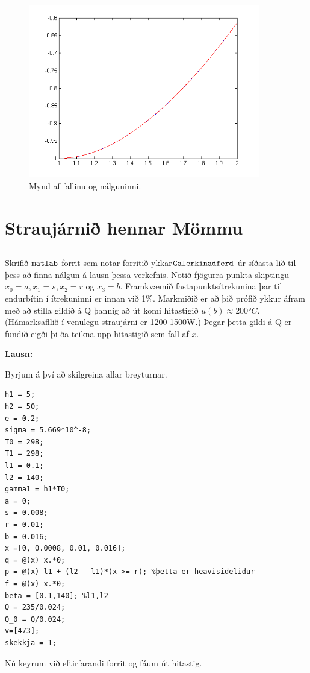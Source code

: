 \documentclass[11pt,a4paper,titlepage]{article}
\begin{document}
   \begin{figure}[h!]
        \centering
        \includegraphics[width=0.9\textwidth]{nalgun2_4.png}
        \caption{Mynd af fallinu og nálguninni.}
        \label{fig:awesome_image2}
    \end{figure}
\section{Straujárnið hennar Mömmu}



\subsection{}

Skrifið $\verb|matlab|$-forrit sem notar forritið ykkar$ \verb|Galerkinadferd| $ úr síðasta lið til þess að finna nálgun á lausn þessa verkefnis. Notið fjögurra punkta skiptingu  $x_{0}=a, x_{1}=s, x_{2}=r$ og $x_{3}=b$.  Framkvæmið fastapunktsítrekunina þar til endurbítin í ítrekuninni er innan við 1\%.  Markmiðið er að þið prófið ykkur áfram með að stilla gildið á Q þannig að út komi hitastigið $u(b)\approx 200°C$. (Hámarksafllið í venulegu straujárni er 1200-1500W.) Þegar þetta gildi á Q er fundið eigði þi ða teikna upp hitastigið sem fall af $x$. 

\par
\textbf{Lausn:}\par
Byrjum á því að skilgreina allar breyturnar.
\begin{verbatim}
h1 = 5;
h2 = 50;
e = 0.2;
sigma = 5.669*10^-8;
T0 = 298;
T1 = 298;
l1 = 0.1;
l2 = 140;
gamma1 = h1*T0;
a = 0;
s = 0.008;
r = 0.01;
b = 0.016;
x =[0, 0.0008, 0.01, 0.016];
q = @(x) x.*0;
p = @(x) l1 + (l2 - l1)*(x >= r); %þetta er heavisidelidur
f = @(x) x.*0;
beta = [0.1,140]; %l1,l2
Q = 235/0.024;
Q_0 = Q/0.024;
v=[473];
skekkja = 1;
\end{verbatim}
 Nú keyrum við eftirfarandi forrit og fáum út hitastig. 
 
\end{document}
